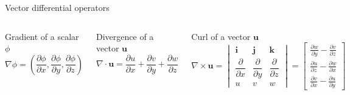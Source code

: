 \documentclass[aspectratio=169]{beamer}
\begin{document}

\begin{frame}{Vector differential operators}
\begin{columns}[T,onlytextwidth]
\begin{block}{Gradient of a scalar $\phi$}
\[
\nabla \phi =
\left(
\frac{\partial \phi}{\partial x},
\frac{\partial \phi}{\partial y},
\frac{\partial \phi}{\partial z}
\right)
\]
\end{block}

\begin{block}{Divergence of a vector $\mathbf{u}$}
\[
\nabla \!\cdot\! \mathbf{u}
= \frac{\partial u}{\partial x}
+ \frac{\partial v}{\partial y}
+ \frac{\partial w}{\partial z}
\]
\end{block}

\begin{block}{Curl of a vector $\mathbf{u}$}
\[
\nabla \!\times\! \mathbf{u} =
\begin{vmatrix}
\mathbf{i} & \mathbf{j} & \mathbf{k} \\
\dfrac{\partial}{\partial x} &
\dfrac{\partial}{\partial y} &
\dfrac{\partial}{\partial z} \\
u & v & w
\end{vmatrix}
=
\left[
\begin{aligned}
\frac{\partial w}{\partial y} - \frac{\partial v}{\partial z} \\
\frac{\partial u}{\partial z} - \frac{\partial w}{\partial x} \\
\frac{\partial v}{\partial x} - \frac{\partial u}{\partial y}
\end{aligned}
\right]
\]
\end{block}
\end{columns}
\end{frame}


\end{document}
